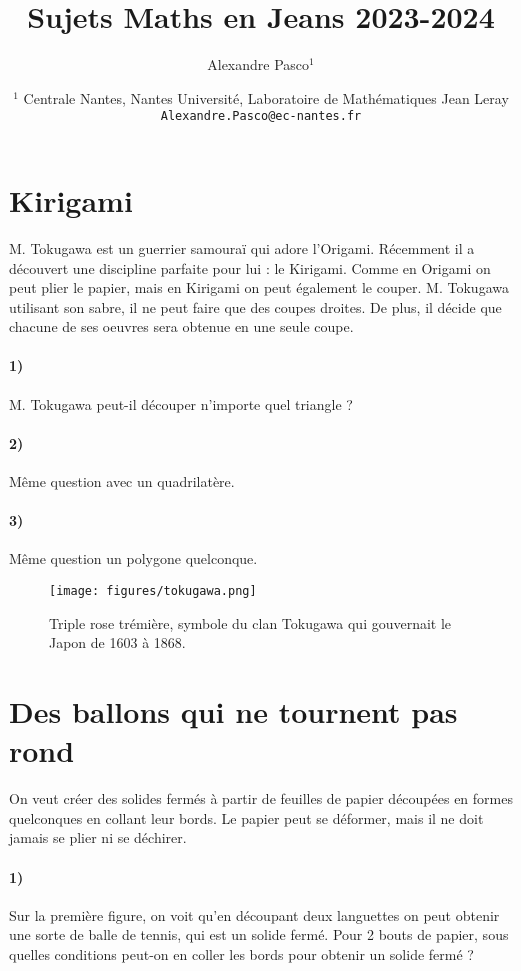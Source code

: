 \documentclass[a4paper,10pt,oneside]{article}
\title{Sujets Maths en Jeans 2023-2024}
\author{
  Alexandre Pasco${}^{1}$}
\date{\medskip%
  \small %
  ${}^1$  Centrale Nantes, Nantes Université, Laboratoire de Mathématiques Jean Leray\\
  \texttt{Alexandre.Pasco@ec-nantes.fr}
  }
\begin{document}
\maketitle


\clearpage
\section{Kirigami}

M. Tokugawa est un guerrier samouraï qui adore l'Origami.
Récemment il a découvert une discipline parfaite pour lui : le Kirigami.
Comme en Origami on peut plier le papier, mais en Kirigami on peut également le couper.
M. Tokugawa utilisant son sabre, il ne peut faire que des coupes droites.
De plus, il décide que chacune de ses oeuvres sera obtenue en une seule coupe.


\paragraph*{1)}
M. Tokugawa peut-il découper n'importe quel triangle ?

\paragraph*{2)}
Même question avec un quadrilatère.

\paragraph*{3)}
Même question un polygone quelconque.

\vspace{3cm}
\begin{figure}[!ht]
  \centering
  \texttt{[image: figures/tokugawa.png]}
  \caption*{Triple rose trémière, symbole du clan Tokugawa qui gouvernait le Japon de 1603 à 1868.}
\end{figure}



\clearpage
\section{Des ballons qui ne tournent pas rond}

On veut créer des solides fermés à partir de feuilles de papier découpées en formes quelconques en collant leur bords.
Le papier peut se déformer, mais il ne doit jamais se plier ni se déchirer.

\paragraph*{1)}
Sur la première figure, on voit qu'en découpant deux languettes on peut obtenir une sorte de balle de tennis, qui est un solide fermé.
Pour 2 bouts de papier, sous quelles conditions peut-on en coller les bords pour obtenir un solide fermé ?
\end{document}
